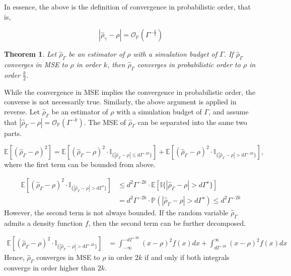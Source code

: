 \documentclass{article}
\newtheorem{theorem}{Theorem}
\begin{document}
In essence, the above is the definition of convergence in probabilistic order, that is,

$$
    \left| \hat{\rho}_{\gamma} - \rho \right| = \mathcal{O}_\mathbb{P} \left( \Gamma^{-\frac{k}{2}} \right)
$$

\begin{theorem} \label{thm:convergence-mse-prob}
    Let $\hat{\rho}_{\Gamma}$ be an estimator of $\rho$ with a simulation budget of $\Gamma$. 
    If $\hat{\rho}_{\Gamma}$ converges in MSE to $\rho$ in order $k$, then $\hat{\rho}_{\Gamma}$ converges in probabilistic order to $\rho$ in order $\frac{k}{2}$.
\end{theorem}

While the convergence in MSE implies the convergence in probabilistic order, the converse is not necessarily true.
Similarly, the above argument is applied in reverse.
Let $\hat{\rho}_{\Gamma}$ be an estimator of $\rho$ with a simulation budget of $\Gamma$, and assume that $|\hat{\rho}_{\Gamma} - \rho| = \mathcal{O}_{\mathbb{P}}(\Gamma^{-k})$.
The MSE of $\hat{\rho}_{\Gamma}$ can be separated into the same two parts.

$$
    \mathbb{E}\left[ \left(\hat{\rho}_{\Gamma} - \rho\right)^2 \right] = \mathbb{E} \left[ \left(\hat{\rho}_{\Gamma} - \rho\right)^2 \cdot \mathbb{I}_{\{|\hat{\rho}_{\Gamma} - \rho| \leq d\Gamma^{-2k}\}} \right] + \mathbb{E} \left[ \left(\hat{\rho}_{\Gamma} - \rho\right)^2 \cdot \mathbb{I}_{\{|\hat{\rho}_{\Gamma} - \rho| > d\Gamma^{-2k}\}} \right], 
$$
where the first term can be bounded from above.

\begin{align*}
    \mathbb{E} \left[ \left(\hat{\rho}_{\Gamma} - \rho\right)^2 \cdot \mathbb{I}_{\{|\hat{\rho}_{\Gamma} - \rho| > d\Gamma^s\}} \right] 
    & \leq d^2 \Gamma^{-2k} \cdot \mathbb{E} \left[ \mathbb{I}\{|\hat{\rho}_{\Gamma} - \rho| > d\Gamma^s \} \right] \\
    & = d^2 \Gamma^{-2k} \cdot \mathbb{P} \left(|\hat{\rho}_{\Gamma} - \rho| > d\Gamma^s \right) \leq d^2 \Gamma^{-2k} 
\end{align*}
However, the second term is not always bounded. 
If the random variable $\hat{\rho}_{\Gamma}$ admits a density function $f$, then the second term can be further decomposed.

\begin{align*}
    \mathbb{E} \left[ \left(\hat{\rho}_{\Gamma} - \rho\right)^2 \cdot \mathbb{I}_{\{|\hat{\rho}_{\Gamma} - \rho| > d\Gamma^{-2k}\}} \right] 
    & = \int_{-\infty}^{-d\Gamma^{-2k}} (x - \rho)^2 f(x) dx + \int_{d\Gamma^{-2k}}^{\infty} (x - \rho)^2 f(x) dx 
\end{align*}
Hence, $\hat{\rho}_{\Gamma}$ converges in MSE to $\rho$ in order $2k$ if and only if both integrals converge in order higher than $2k$. 
\end{document}
